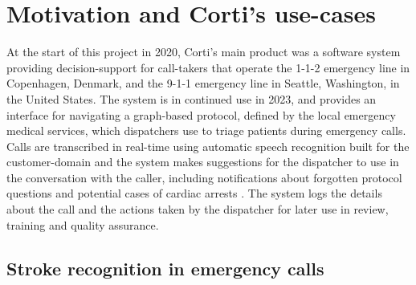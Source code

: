 \section{Motivation and Corti's use-cases}
%
%
At the start of this project in 2020, Corti's main product was a software system providing decision-support for call-takers that operate the 1-1-2 emergency line in Copenhagen, Denmark, and the 9-1-1 emergency line in Seattle, Washington, in the United States.
The system is in continued use in 2023, and provides an interface for navigating a graph-based protocol, defined by the local emergency medical services, which dispatchers use to triage patients during emergency calls. 
Calls are transcribed in real-time using automatic speech recognition built for the customer-domain and the system makes suggestions for the dispatcher to use in the conversation with the caller, including notifications about forgotten protocol questions \cite{havtorn_multiqt_2020} and potential cases of cardiac arrests \cite{cite15, cite14}. The system logs the details about the call and the actions taken by the dispatcher for later use in review, training and quality assurance. 


\subsection{Stroke recognition in emergency calls}
%
